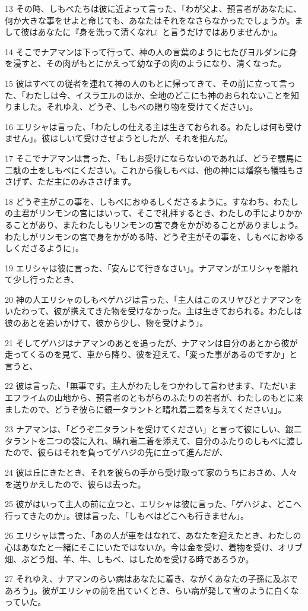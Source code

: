 \par 13 その時、しもべたちは彼に近よって言った、「わが父よ、預言者があなたに、何か大きな事をせよと命じても、あなたはそれをなさらなかったでしょうか。まして彼はあなたに『身を洗って清くなれ』と言うだけではありませんか」。
\par 14 そこでナアマンは下って行って、神の人の言葉のように七たびヨルダンに身を浸すと、その肉がもとにかえって幼な子の肉のようになり、清くなった。
\par 15 彼はすべての従者を連れて神の人のもとに帰ってきて、その前に立って言った、「わたしは今、イスラエルのほか、全地のどこにも神のおられないことを知りました。それゆえ、どうぞ、しもべの贈り物を受けてください」。
\par 16 エリシャは言った、「わたしの仕える主は生きておられる。わたしは何も受けません」。彼はしいて受けさせようとしたが、それを拒んだ。
\par 17 そこでナアマンは言った、「もしお受けにならないのであれば、どうぞ騾馬に二駄の土をしもべにください。これから後しもべは、他の神には燔祭も犠牲もささげず、ただ主にのみささげます。
\par 18 どうぞ主がこの事を、しもべにおゆるしくださるように。すなわち、わたしの主君がリンモンの宮にはいって、そこで礼拝するとき、わたしの手によりかかることがあり、またわたしもリンモンの宮で身をかがめることがありましょう。わたしがリンモンの宮で身をかがめる時、どうぞ主がその事を、しもべにおゆるしくださるように」。
\par 19 エリシャは彼に言った、「安んじて行きなさい」。ナアマンがエリシャを離れて少し行ったとき、
\par 20 神の人エリシャのしもべゲハジは言った、「主人はこのスリヤびとナアマンをいたわって、彼が携えてきた物を受けなかった。主は生きておられる。わたしは彼のあとを追いかけて、彼から少し、物を受けよう」。
\par 21 そしてゲハジはナアマンのあとを追ったが、ナアマンは自分のあとから彼が走ってくるのを見て、車から降り、彼を迎えて、「変った事があるのですか」と言うと、
\par 22 彼は言った、「無事です。主人がわたしをつかわして言わせます、『ただいまエフライムの山地から、預言者のともがらのふたりの若者が、わたしのもとに来ましたので、どうぞ彼らに銀一タラントと晴れ着二着を与えてください』」。
\par 23 ナアマンは、「どうぞ二タラントを受けてください」と言って彼にしい、銀二タラントを二つの袋に入れ、晴れ着二着を添えて、自分のふたりのしもべに渡したので、彼らはそれを負ってゲハジの先に立って進んだが、
\par 24 彼は丘にきたとき、それを彼らの手から受け取って家のうちにおさめ、人々を送りかえしたので、彼らは去った。
\par 25 彼がはいって主人の前に立つと、エリシャは彼に言った、「ゲハジよ、どこへ行ってきたのか」。彼は言った、「しもべはどこへも行きません」。
\par 26 エリシャは言った、「あの人が車をはなれて、あなたを迎えたとき、わたしの心はあなたと一緒にそこにいたではないか。今は金を受け、着物を受け、オリブ畑、ぶどう畑、羊、牛、しもべ、はしためを受ける時であろうか。
\par 27 それゆえ、ナアマンのらい病はあなたに着き、ながくあなたの子孫に及ぶであろう」。彼がエリシャの前を出ていくとき、らい病が発して雪のように白くなっていた。

